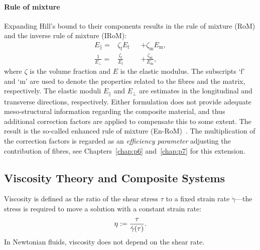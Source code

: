 \paragraph{Rule of mixture} Expanding Hill's bound to their components results in the rule of mixture (RoM) and the inverse rule of mixture (IRoM):
	\begin{subequations}
	\begin{alignat}{2}
		E_\parallel 		=& \zeta_\text{f}E_\text{f}          &&+\zeta_\text{m}E_\text{m},\\
		\frac{1}{E_\perp}	=& \frac{\zeta_\text{f}}{E_\text{f}} &&+ \frac{\zeta_\text{m}}{E_\text{m}},
	\end{alignat}
	\end{subequations}
	where $\zeta$ is the volume fraction and $E$ is the elastic modulus. The subscripts `$\text{f}$' and `$\text{m}$' are used to denote the properties related to the fibres and the matrix, respectively. The elastic moduli $E_\parallel$ and $E_\perp$ are estimates in the longitudinal and transverse directions, respectively. Either formulation does not provide adequate meso-structural information regarding the composite material, and thus additional correction factors are applied to compensate this to some extent. The result is the so-called enhanced rule of mixture (En-RoM)~\autocite{Summerscales.2019}. The multiplication of the correction factors is regarded as an \textit{efficiency parameter} adjusting the contribution of fibres, see Chapters~\ref{chap:p6} and~\ref{chap:p7} for this extension.
	
\subsection{Viscosity Theory and Composite Systems}
	Viscosity is defined as the ratio of the shear stress $\tau$ to a fixed strain rate $\dot{\gamma}$---the stress is required to move a solution with a constant strain rate:
	\begin{equation}
		\eta \mathrel{:=} \frac{\tau}{\dot{\gamma}(\tau)}.\label{eq:vis}
	\end{equation}
	In Newtonian fluids, viscosity does not depend on the shear rate. 
	
